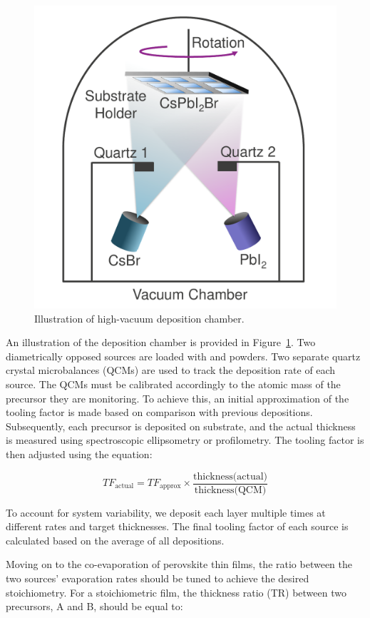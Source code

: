 \begin{figure}
  \centering
  \medskip
  \includegraphics[width=.5\textwidth]{chapters/material_properties/images/Chamber.pdf}
  \caption[Short caption for Table of Figures]{Illustration of high-vacuum deposition chamber.}
  \label{fig:deposition_chamber}
\end{figure}




An illustration of the deposition chamber is provided in Figure~\ref{fig:deposition_chamber}. Two diametrically opposed sources are loaded with  and  powders. Two separate quartz crystal microbalances (QCMs) are used to track the deposition rate of each source. The QCMs must be calibrated accordingly to the atomic mass of the precursor they are monitoring. To achieve this, an initial approximation of the tooling factor is made based on comparison with previous depositions. Subsequently, each precursor is deposited on  substrate, and the actual thickness is measured using spectroscopic ellipsometry or profilometry. The tooling factor is then adjusted using the equation: 

\begin{equation}
    TF_{\text{actual}} = TF_{\text{approx}} \times \frac{\text{thickness(actual)}}{\text{thickness(QCM)}}
\end{equation}

To account for system variability, we deposit each layer multiple times at different rates and target thicknesses. The final tooling factor of each source is calculated based on the average of all depositions.


Moving on to the co-evaporation of perovskite thin films, the ratio between the two sources' evaporation rates should be tuned to achieve the desired stoichiometry. For a stoichiometric film, the thickness ratio (TR) between two precursors, A and B, should be equal to: 

